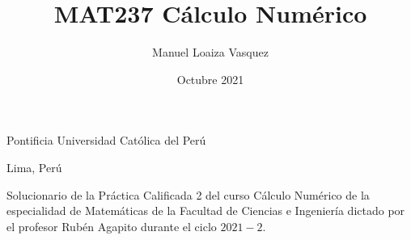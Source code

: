 \title{MAT237 C\'alculo Num\'erico}
\author{Manuel Loaiza Vasquez}
\date{Octubre 2021}

\graphicspath{{graphics/}}



\maketitle

\vspace*{-0.25in}
\centerline{Pontificia Universidad Cat\'olica del Per\'u}
\centerline{Lima, Per\'u}
\centerline{}
\vspace*{0.15in}

\begin{framed}
    Solucionario de la Pr\'actica Calificada 2 del curso C\'alculo Num\'erico
    de la especialidad de Matem\'aticas de la Facultad de Ciencias e Ingenier\'ia
    dictado por el profesor Rub\'en Agapito durante el ciclo $2021-2$.
\end{framed}









